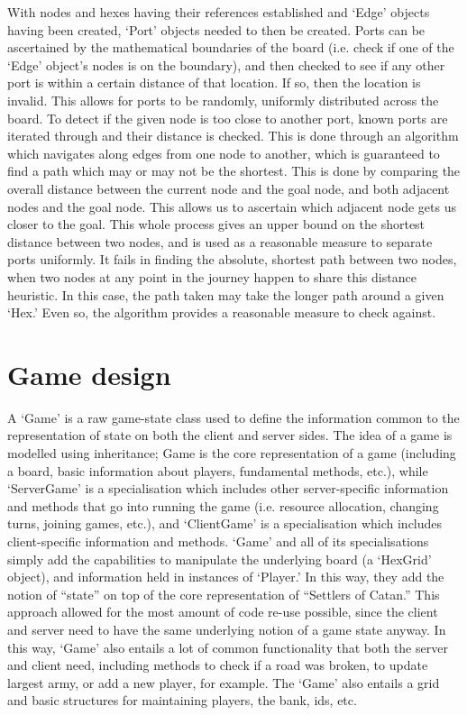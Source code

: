 \documentclass[a4paper,doc,draftfirst]{apa6}
\begin{document}
With nodes and hexes having their references established and ‘Edge’ objects having been created, ‘Port’ objects needed to then be created. Ports can be ascertained by the mathematical boundaries of the board (i.e. check if one of the ‘Edge’ object’s nodes is on the boundary), and then checked to see if any other port is within a certain distance of that location. If so, then the location is invalid. This allows for ports to be randomly, uniformly distributed across the board. To detect if the given node is too close to another port, known ports are iterated through and their distance is checked. This is done through an algorithm which navigates along edges from one node to another, which is guaranteed to find a path which may or may not be the shortest. This is done by comparing the overall distance between the current node and the goal node, and both adjacent nodes and the goal node. This allows us to ascertain which adjacent node gets us closer to the goal. This whole process gives an upper bound on the shortest distance between two nodes, and is used as a reasonable measure to separate ports uniformly. It fails in finding the absolute, shortest path between two nodes, when two nodes at any point in the journey happen to share this distance heuristic. In this case, the path taken may take the longer path around a given ‘Hex.’ Even so, the algorithm provides a reasonable measure to check against.

\section{Game design}
A ‘Game’ is a raw game-state class used to define the information common to the representation of state on both the client and server sides. The idea of a game is modelled using inheritance; Game is the core representation of a game (including a board, basic information about players, fundamental methods, etc.), while ‘ServerGame’ is a specialisation which includes other server-specific information and methods that go into running the game (i.e. resource allocation, changing turns, joining games, etc.), and ‘ClientGame’ is a specialisation which includes client-specific information and methods. ‘Game’ and all of its specialisations simply add the capabilities to manipulate the underlying board (a ‘HexGrid’ object), and information held in instances of ‘Player.’ In this way, they add the notion of “state” on top of the core representation of “Settlers of Catan.” This approach allowed for the most amount of code re-use possible, since the client and server need to have the same underlying notion of a game state anyway. In this way, ‘Game’ also entails a lot of common functionality that both the server and client need, including methods to check if a road was broken, to update largest army, or add a new player, for example. The ‘Game’ also entails a grid and basic structures for maintaining players, the bank, ids, etc.
\end{document}
